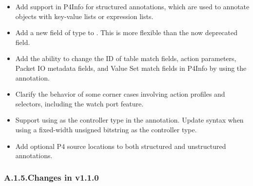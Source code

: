 \documentclass[11pt]{article}
\begin{document}
{\begin{itemize}[noitemsep,topsep=\mdcompacttopsep]
\item{}Add support in P4Info for structured annotations, which are used to annotate
objects with key-value lists or expression lists.%

\item{}Add a new  field of type  to . This is more
flexible than the now deprecated  field.%

\item{}Add the ability to change the ID of table match fields, action parameters,
Packet IO metadata fields, and Value Set match fields in P4Info by using the
 annotation.%

\item{}Clarify the behavior of some corner cases involving action profiles and
selectors, including the watch port feature.%

\item{}Support using  as the controller type in the 
annotation. Update syntax when using a fixed-width unsigned bitstring as the
controller type.%

\item{}Add optional P4 source locations to both structured and unstructured
annotations.%
\end{itemize}%

\subsubsection{A.1.5.\hspace*{0.5em}Changes in v1.1.0}\label{sec-changes-in-v110}%

}
\end{document}

